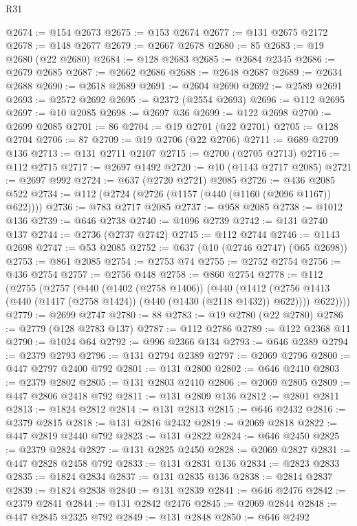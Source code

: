 \begin{lexlean}{R31}
\begin{coremodule}
@2674 := @154 @2673
@2675 := @153 @2674
@2677 := @131 @2675 @2172
@2678 := @148 @2677
@2679 := @2667 @2678
@2680 := 85
@2683 := @19 @2680 (@22 @2680)
@2684 := @128 @2683
@2685 := @2684 @2345
@2686 := @2679 @2685
@2687 := @2662 @2686
@2688 := @2648 @2687
@2689 := @2634 @2688
@2690 := @2618 @2689
@2691 := @2604 @2690
@2692 := @2589 @2691
@2693 := @2572 @2692
@2695 := @2372 (@2554 @2693)
@2696 := @112 @2695
@2697 := @10 @2085
@2698 := @2697 @36
@2699 := @122 @2698
@2700 := @2699 @2085
@2701 := 86
@2704 := @19 @2701 (@22 @2701)
@2705 := @128 @2704
@2706 := 87
@2709 := @19 @2706 (@22 @2706)
@2711 := @689 @2709 @136
@2713 := @131 @2711 @2107
@2715 := @2700 (@2705 @2713)
@2716 := @112 @2715
@2717 := @2697 @1492
@2720 := @10 (@1143 @2717 @2085)
@2721 := @2697 @992
@2724 := @637 (@2720 @2721) @2085
@2726 := @436 @2085 @522
@2734 := @112 (@2724 (@2726 (@1157 (@440 (@1160 (@2096 @1167)) @622))))
@2736 := @783 @2717 @2085
@2737 := @958 @2085
@2738 := @1012 @136
@2739 := @646 @2738
@2740 := @1096 @2739
@2742 := @131 @2740 @137
@2744 := @2736 (@2737 @2742)
@2745 := @112 @2744
@2746 := @1143 @2698
@2747 := @53 @2085
@2752 := @637 (@10 (@2746 @2747) (@65 @2698))
@2753 := @861 @2085
@2754 := @2753 @74
@2755 := @2752 @2754
@2756 := @436 @2754
@2757 := @2756 @448
@2758 := @860 @2754
@2778 := @112
    (@2755
      (@2757
        (@440
          (@1402 (@2758 @1406))
          (@440
            (@1412 (@2756 @1413 (@440 (@1417 (@2758 @1424)) (@440 (@1430 (@2118 @1432)) @622))))
            @622))))
@2779 := @2699 @2747
@2780 := 88
@2783 := @19 @2780 (@22 @2780)
@2786 := @2779 (@128 @2783 @137)
@2787 := @112 @2786
@2789 := @122 @2368 @11
@2790 := @1024 @64
@2792 := @996 @2366 @134
@2793 := @646 @2389
@2794 := @2379 @2793
@2796 := @131 @2794 @2389
@2797 := @2069 @2796
@2800 := @447 @2797 @2400 @792
@2801 := @131 @2800
@2802 := @646 @2410
@2803 := @2379 @2802
@2805 := @131 @2803 @2410
@2806 := @2069 @2805
@2809 := @447 @2806 @2418 @792
@2811 := @131 @2809 @136
@2812 := @2801 @2811
@2813 := @1824 @2812
@2814 := @131 @2813
@2815 := @646 @2432
@2816 := @2379 @2815
@2818 := @131 @2816 @2432
@2819 := @2069 @2818
@2822 := @447 @2819 @2440 @792
@2823 := @131 @2822
@2824 := @646 @2450
@2825 := @2379 @2824
@2827 := @131 @2825 @2450
@2828 := @2069 @2827
@2831 := @447 @2828 @2458 @792
@2833 := @131 @2831 @136
@2834 := @2823 @2833
@2835 := @1824 @2834
@2837 := @131 @2835 @136
@2838 := @2814 @2837
@2839 := @1824 @2838
@2840 := @131 @2839
@2841 := @646 @2476
@2842 := @2379 @2841
@2844 := @131 @2842 @2476
@2845 := @2069 @2844
@2848 := @447 @2845 @2325 @792
@2849 := @131 @2848
@2850 := @646 @2492

\end{coremodule}
\end{lexlean}
